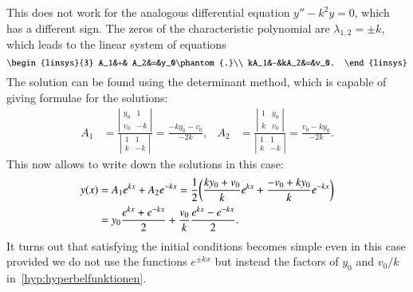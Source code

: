 This does not work for the analogous differential equation
$y''-k^2y=0$, which has a different sign.
The zeros of the characteristic polynomial are $\lambda_{1,2}=\pm k$,
which leads to the linear system of equations
\[
\begin{linsys}{3}
 A_1&+& A_2&=&y_0\phantom{.}\\
kA_1&-&kA_2&=&v_0.
\end{linsys}
\]
The solution can be found using the determinant method, which is
capable of giving formulae for the solutions:
\begin{align*}
A_1
&=
\frac{\left|\begin{matrix}y_0&1\\v_0&-k\end{matrix}\right|}{\left|\begin{matrix}1&1\\k&-k\end{matrix}\right|}
=
\frac{-ky_0-v_0}{-2k},
&
A_2
&=
\frac{\left|\begin{matrix}1&y_0\\k&v_0\end{matrix}\right|}{\left|\begin{matrix}1&1\\k&-k\end{matrix}\right|}
=\frac{v_0-ky_0}{-2k}.
\end{align*}
This now allows to write down the solutions in this case:
\begin{align}
y(x)
&=
A_1e^{kx}+A_2e^{-kx}
=
\frac12\biggl(
\frac{ky_0+v_0}k e^{kx}
+
\frac{-v_0+ky_0}k e^{-kx}
\biggr)
\notag
\\
&=
y_0\frac{e^{kx}+e^{-kx}}2
+\frac{v_0}{k}\frac{e^{kx}-e^{-kx}}2.
\label{hyp:hyperbelfunktionen}
\end{align}
It turns out that satisfying the initial conditions becomes simple
even in this case provided we do not use the functions $e^{\pm kx}$
but instead the factors of $y_0$ and $v_0/k$ in~\eqref{hyp:hyperbelfunktionen}.

